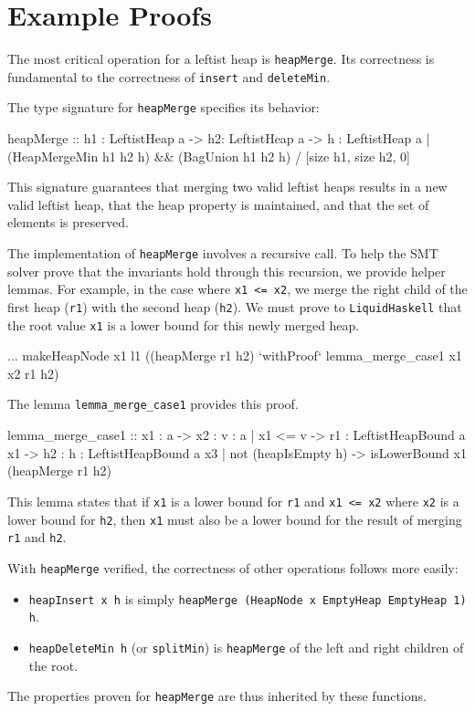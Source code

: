 \section{Example Proofs}
The most critical operation for a leftist heap is \texttt{heapMerge}. Its correctness is fundamental to the correctness of \texttt{insert} and \texttt{deleteMin}.

The type signature for \texttt{heapMerge} specifies its behavior:
\begin{code}
  heapMerge :: h1 : LeftistHeap a 
        -> h2: LeftistHeap a 
        -> {h : LeftistHeap a | (HeapMergeMin h1 h2 h) 
                             && (BagUnion h1 h2 h)}
        / [size h1, size h2, 0]
\end{code}
This signature guarantees that merging two valid leftist heaps results in a new valid leftist heap, that the heap property is maintained, and that the set of elements is preserved.

The implementation of \texttt{heapMerge} involves a recursive call. To help the SMT solver prove that the invariants hold through this recursion, we provide helper lemmas. For example, in the case where \texttt{x1 <= x2}, we merge the right child of the first heap (\texttt{r1}) with the second heap (\texttt{h2}). We must prove to \texttt{LiquidHaskell} that the root value \texttt{x1} is a lower bound for this newly merged heap.
\begin{code}
... makeHeapNode x1 l1 ((heapMerge r1 h2) 
    `withProof` lemma_merge_case1 x1 x2 r1 h2)
\end{code}
The lemma \texttt{lemma\_merge\_case1} provides this proof.
\begin{code}
  lemma_merge_case1 :: x1 : a  
        -> x2 : {v : a |  x1  <= v}
        -> r1 : LeftistHeapBound a x1 
        -> h2 : {h : LeftistHeapBound a x3 | not (heapIsEmpty h) }  
        -> {isLowerBound x1 (heapMerge r1 h2)}
\end{code}
This lemma states that if \texttt{x1} is a lower bound for \texttt{r1} and \texttt{x1 <= x2} where \texttt{x2} is a lower bound for \texttt{h2}, then \texttt{x1} must also be a lower bound for the result of merging \texttt{r1} and \texttt{h2}.

With \texttt{heapMerge} verified, the correctness of other operations follows more easily:
\begin{itemize}
	\item \texttt{heapInsert x h} is simply \texttt{heapMerge (HeapNode x EmptyHeap EmptyHeap 1) h}.
	\item \texttt{heapDeleteMin h} (or \texttt{splitMin}) is \texttt{heapMerge} of the left and right children of the root.
\end{itemize}
The properties proven for \texttt{heapMerge} are thus inherited by these functions.

